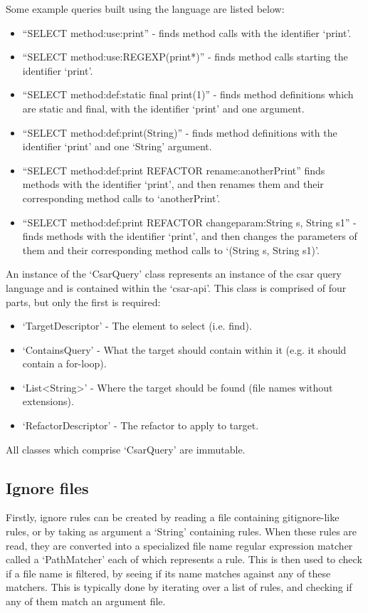 \documentclass[12pt, letterpaper]{article}
\begin{document}
Some example queries built using the language are listed below:
\begin{itemize}
  \item ``SELECT method:use:print'' - finds method calls with the identifier `print'.
  \item ``SELECT method:use:REGEXP(print*)'' - finds method calls starting the identifier `print'.
  \item ``SELECT method:def:static final print(1)'' - finds method definitions which are static and final, with the identifier `print' and one argument.
  \item ``SELECT method:def:print(String)'' - finds method definitions with the identifier `print' and one `String' argument.
  \item ``SELECT method:def:print REFACTOR rename:anotherPrint'' finds methods with the identifier `print', and then renames them and their corresponding method calls to `anotherPrint'.
  \item ``SELECT method:def:print REFACTOR changeparam:String s, String s1'' - finds methods with the identifier `print', and then changes the parameters of them and their corresponding method calls to `(String s, String s1)'.
\end{itemize}

An instance of the `CsarQuery' class represents an instance of the csar query language and is contained within the `csar-api'.
This class is comprised of four parts, but only the first is required:
\begin{itemize}
  \item `TargetDescriptor' - The element to select (i.e. find).
  \item `ContainsQuery' - What the target should contain within it (e.g. it should contain a for-loop).
  \item `List<String>' - Where the target should be found (file names without extensions).
  \item `RefactorDescriptor' - The refactor to apply to target.
\end{itemize}

All classes which comprise `CsarQuery' are immutable.

\subsection{Ignore files}
Firstly, ignore rules can be created by reading a file containing gitignore-like rules, or by taking as argument a `String' containing rules.
When these rules are read, they are converted into a specialized file name regular expression matcher called a `PathMatcher' each of which represents a rule.
This is then used to check if a file name is filtered, by seeing if its name matches against any of these matchers.
This is typically done by iterating over a list of rules, and checking if any of them match an argument file.
\end{document}
